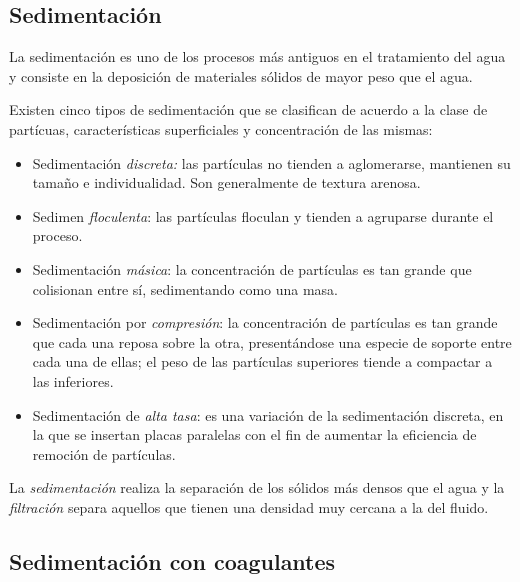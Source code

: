 \begin{center}
	\section{Sedimentaci\'on}
\end{center}

\noindent
\justify

La sedimentaci\'on es uno de los procesos m\'as antiguos en el tratamiento del agua y consiste en la deposici\'on de materiales s\'olidos de mayor peso que el agua.

\noindent
\justify

Existen cinco tipos de sedimentaci\'on que se clasifican de acuerdo a  la clase de part\'icuas, caracter\'isticas superficiales y concentraci\'on de las mismas:

\begin{itemize}
	\item Sedimentaci\'on \textit{discreta:} las part\'iculas no tienden a aglomerarse, mantienen su tama\~no e individualidad. Son generalmente de textura arenosa.
	\item Sedimen \textit{floculenta}: las part\'iculas floculan y tienden a agruparse durante el proceso.
	\item Sedimentaci\'on \textit{m\'asica}: la concentraci\'on de part\'iculas es tan grande que colisionan entre s\'i, sedimentando como una masa.
	\item Sedimentaci\'on por \textit{compresi\'on}: la concentraci\'on de part\'iculas es tan grande que cada una reposa sobre la otra, present\'andose una especie de soporte entre cada una de ellas; el peso de las part\'iculas superiores tiende a compactar a las inferiores.
	\item Sedimentaci\'on de \textit{alta tasa}: es una variaci\'on de la sedimentaci\'on discreta, en la que se insertan placas paralelas con el fin de aumentar la eficiencia de remoci\'on de part\'iculas.
\end{itemize}

\noindent
\justify

La \textit{sedimentaci\'on} realiza la separaci\'on de los s\'olidos m\'as densos que el agua y la \textit{filtraci\'on} separa aquellos que tienen una densidad muy cercana a la del fluido.

\subsection{Sedimentaci\'on con coagulantes}

